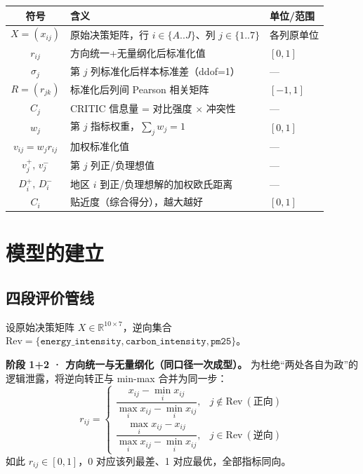 \documentclass[12pt,a4paper]{ctexart}
\begin{document}
\begin{center}
\begin{tabular}{cll}
\toprule
符号 & 含义 & 单位/范围 \\
\midrule
$X=(x_{ij})$ & 原始决策矩阵，行 $i\in\{A..J\}$、列 $j\in\{1..7\}$ & 各列原单位 \\
$r_{ij}$ & 方向统一+无量纲化后标准化值 & $[0,1]$ \\
$\sigma_j$ & 第 $j$ 列标准化后样本标准差（ddof=1） & --- \\
$R=(r_{jk})$ & 标准化后列间 Pearson 相关矩阵 & $[-1,1]$ \\
$C_j$ & CRITIC 信息量 = 对比强度 $\times$ 冲突性 & --- \\
$w_j$ & 第 $j$ 指标权重，$\sum_j w_j=1$ & $[0,1]$ \\
$v_{ij}=w_j r_{ij}$ & 加权标准化值 & --- \\
$v_j^+,\,v_j^-$ & 第 $j$ 列正/负理想值 & --- \\
$D_i^+,\,D_i^-$ & 地区 $i$ 到正/负理想解的加权欧氏距离 & --- \\
$C_i$ & 贴近度（综合得分），越大越好 & $[0,1]$ \\
\bottomrule
\end{tabular}
\end{center}

\section{模型的建立}

\subsection{四段评价管线}

设原始决策矩阵 $X\in\mathbb{R}^{10\times7}$，逆向集合 $\mathrm{Rev}=\{\texttt{energy\_intensity},\texttt{carbon\_intensity},\texttt{pm25}\}$。

\textbf{阶段 1+2 · 方向统一与无量纲化（同口径一次成型）。} 为杜绝``两处各自为政''的逻辑泄露，将逆向转正与 min-max 合并为同一步：
\begin{equation}
r_{ij}=
\begin{cases}
\dfrac{x_{ij}-\min_i x_{ij}}{\max_i x_{ij}-\min_i x_{ij}}, & j\notin\mathrm{Rev}\ (\text{正向})\\[2.2ex]
\dfrac{\max_i x_{ij}-x_{ij}}{\max_i x_{ij}-\min_i x_{ij}}, & j\in\mathrm{Rev}\ (\text{逆向})
\end{cases}
\end{equation}
如此 $r_{ij}\in[0,1]$，0 对应该列最差、1 对应最优，全部指标同向。
\end{document}
